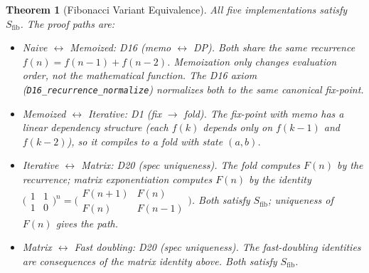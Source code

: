 \documentclass[11pt,a4paper]{report}
\theoremstyle{definition}
\theoremstyle{plain}
\newtheorem{theorem}[definition]{Theorem}
\begin{document}
\begin{theorem}[Fibonacci Variant Equivalence]
\label{thm:fib-equiv}
All five implementations satisfy $S_{\mathrm{fib}}$.  The proof paths are:
\begin{itemize}
  \item \emph{Naive $\leftrightarrow$ Memoized}: D16 (memo $\leftrightarrow$ DP).
    Both share the same recurrence
    $f(n) = f(n{-}1) + f(n{-}2)$.  Memoization only changes
    \emph{evaluation order}, not the mathematical function.  The
    D16 axiom (\texttt{D16\_recurrence\_normalize}) normalizes
    both to the same canonical fix-point.
  \item \emph{Memoized $\leftrightarrow$ Iterative}: D1
    (fix $\to$ fold).  The fix-point with memo has a linear
    dependency structure (each $f(k)$ depends only on $f(k{-}1)$
    and $f(k{-}2)$), so it compiles to a fold with state
    $(a, b)$.
  \item \emph{Iterative $\leftrightarrow$ Matrix}: D20
    (spec uniqueness).  The fold computes $F(n)$ by the
    recurrence; matrix exponentiation computes $F(n)$ by the
    identity $\bigl(\begin{smallmatrix}1&1\\1&0\end{smallmatrix}\bigr)^n
    = \bigl(\begin{smallmatrix}F(n{+}1)&F(n)\\
    F(n)&F(n{-}1)\end{smallmatrix}\bigr)$.
    Both satisfy $S_{\mathrm{fib}}$; uniqueness of $F(n)$ gives
    the path.
  \item \emph{Matrix $\leftrightarrow$ Fast doubling}: D20
    (spec uniqueness).  The fast-doubling identities are
    consequences of the matrix identity above.  Both satisfy
    $S_{\mathrm{fib}}$.
\end{itemize}
\end{theorem}
\end{document}
